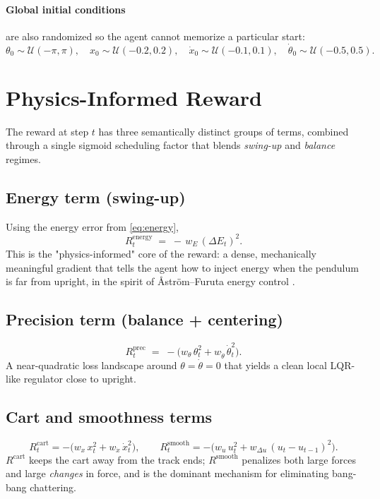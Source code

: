 \documentclass[11pt,a4paper]{article}
\begin{document}
\paragraph{Global initial conditions} are also randomized so the agent cannot memorize a particular start:
\begin{equation}
\theta_0 \sim \mathcal{U}(-\pi, \pi), \quad
x_0 \sim \mathcal{U}(-0.2, 0.2), \quad
\dot{x}_0 \sim \mathcal{U}(-0.1, 0.1), \quad
\dot{\theta}_0 \sim \mathcal{U}(-0.5, 0.5).
\end{equation}

\section{Physics-Informed Reward}

The reward at step $t$ has three semantically distinct groups of terms,
combined through a single sigmoid scheduling factor that blends \emph{swing-up} and \emph{balance} regimes.

\subsection{Energy term (swing-up)}
\label{sec:r-energy}
Using the energy error from \eqref{eq:energy},
\begin{equation}
R^{\text{energy}}_t \;=\; -\,w_E\,(\Delta E_t)^2.
\end{equation}
This is the "physics-informed" core of the reward: a dense, mechanically meaningful gradient that tells the agent how to inject energy when the pendulum is far from upright, in the spirit of \AA{}str\"om--Furuta energy control \cite{astrom2000}.

\subsection{Precision term (balance + centering)}
\begin{equation}
R^{\text{prec}}_t \;=\; -\bigl(w_\theta\,\theta_t^2 + w_{\dot{\theta}}\,\dot{\theta}_t^2\bigr).
\end{equation}
A near-quadratic loss landscape around $\theta = \dot{\theta} = 0$ that yields a clean local LQR-like regulator close to upright.

\subsection{Cart and smoothness terms}
\begin{equation}
R^{\text{cart}}_t = -\bigl(w_x\,x_t^2 + w_{\dot{x}}\,\dot{x}_t^2\bigr),
\qquad
R^{\text{smooth}}_t = -\bigl(w_u\,u_t^2 + w_{\Delta u}\,(u_t - u_{t-1})^2\bigr).
\end{equation}
$R^{\text{cart}}$ keeps the cart away from the track ends; $R^{\text{smooth}}$ penalizes both large forces and large \emph{changes} in force, and is the dominant mechanism for eliminating bang-bang chattering.
\end{document}
